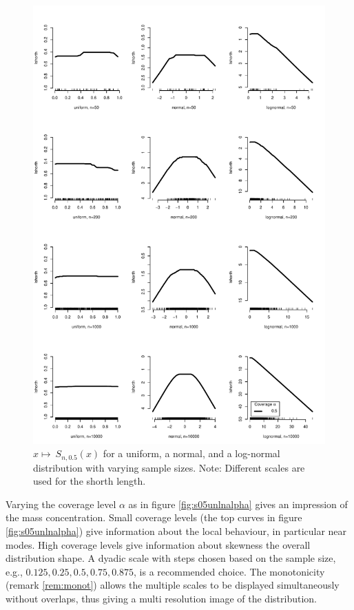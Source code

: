 \documentclass[dvips,12pt,a4paper,twoside]{amsart}
\begin{document}
\begin{figure}[htb]

\includegraphics[width=1.0\linewidth]{TheShorthPlot-s05unln}
\caption{ $x \mapsto  \ S_{n,{0.5}}(x)$
for a uniform, a normal, and a log-normal distribution with varying sample sizes.
Note: Different scales are used for the shorth length.}
\label{fig:s05unln}
\end{figure}

Varying the coverage level $\alpha$ as in figure \ref{fig:s05unlnalpha} gives an impression of the mass concentration. Small coverage levels (the top curves in figure  \ref{fig:s05unlnalpha}) give information about the local behaviour, in particular near modes. High coverage levels give information about skewness the overall distribution shape. A dyadic scale with steps chosen based on the sample size, e.g., $0.125, 0.25, 0.5, 0.75, 0.875$,  is a recommended choice. The monotonicity (remark \ref {rem:monot}) allows the multiple  scales to be displayed simultaneously without overlaps, thus giving a multi resolution image of the distribution.
\end{document}
